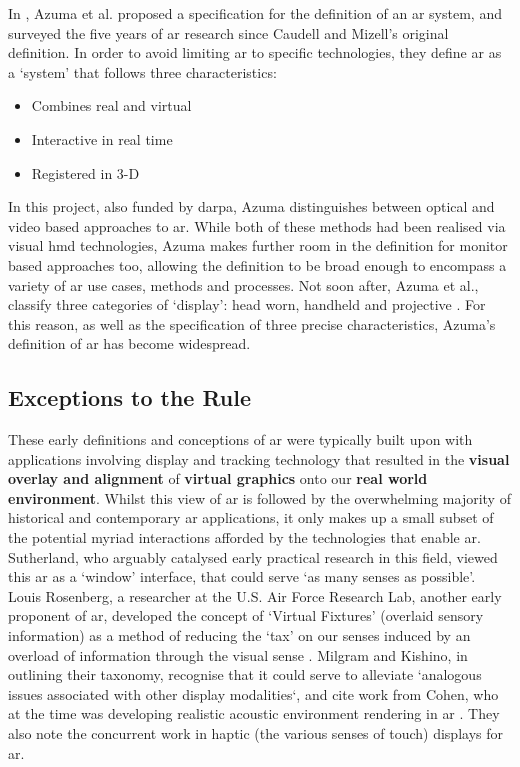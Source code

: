 In \citeyear{azuma1997}, Azuma et al. proposed a specification for the definition of an \gls{ar} system, and surveyed the five years of \gls{ar} research since Caudell and Mizell's original definition. In order to avoid limiting \gls{ar} to specific technologies, they define \gls{ar} as a `system' that follows three characteristics: 

\begin{itemize}
    \item Combines real and virtual
    \item Interactive in real time
    \item Registered in 3-D
\end{itemize}

In this project, also funded by \gls{darpa}, Azuma distinguishes between optical and video based approaches to \gls{ar}. While both of these methods had been realised via visual \gls{hmd} technologies, Azuma makes further room in the definition for monitor based approaches too, allowing the definition to be broad enough to encompass a variety of \gls{ar} use cases, methods and processes. Not soon after, Azuma et al., classify three categories of `display': head worn, handheld and projective \citeyearpar{azuma2001}. For this reason, as well as the specification of three precise characteristics, Azuma's definition of \gls{ar} has become widespread. 

\subsection{Exceptions to the Rule}\label{sec: review-history-exceptions}
These early definitions and conceptions of \gls{ar} were typically built upon with applications involving display and tracking technology that resulted in the \textbf{visual overlay and alignment} of \textbf{virtual graphics} onto our \textbf{real world environment}. Whilst this view of \gls{ar} is followed by the overwhelming majority of historical and contemporary \gls{ar} applications, it only makes up a small subset of the potential myriad interactions afforded by the technologies that enable \gls{ar}. Sutherland, who arguably catalysed early practical research in this field, viewed this \gls{ar} as a `window' interface, that could serve `as many senses as possible'. Louis Rosenberg, a researcher at the U.S. Air Force Research Lab, another early proponent of \gls{ar}, developed the concept of `Virtual Fixtures' (overlaid sensory information) as a method of reducing the `tax' on our senses induced by an overload of information through the visual sense \citep{rosenberg1993}. Milgram and Kishino, in outlining their taxonomy, recognise that it could serve to alleviate `analogous issues associated with other display modalities`, and cite work from Cohen, who at the time was developing realistic acoustic environment rendering in \gls{ar} \citeyearpar{cohen1993}. They also note the concurrent work in haptic (the various senses of touch) displays for \gls{ar}. 

